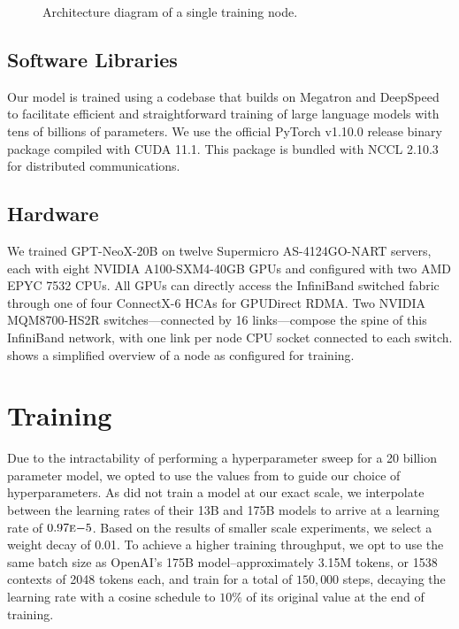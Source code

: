 \documentclass[11pt]{article}
\newcommand{\model}{GPT-NeoX-20B}
\begin{document}
\begin{figure}[hbt]
    \centering
    
    \caption{Architecture diagram of a single training node.}
    \label{fig:training-node}
\end{figure}

\subsection{Software Libraries}
\label{subsec:software}

Our model is trained using a codebase that builds on Megatron \citep{shoeybi2020megatronlm} and DeepSpeed \citep{rasley2020deepspeed} to facilitate efficient and straightforward training of large language models with tens of billions of parameters. We use the official PyTorch v1.10.0 release binary package compiled with CUDA 11.1. This package is bundled with NCCL 2.10.3 for distributed communications.

\subsection{Hardware}
\label{subsec:hardware}

We trained \model{} on twelve Supermicro AS-4124GO-NART servers, each with eight NVIDIA A100-SXM4-40GB GPUs and configured with two AMD EPYC 7532 CPUs. All GPUs can directly access the InfiniBand switched fabric through one of four ConnectX-6 HCAs for GPUDirect RDMA. Two NVIDIA MQM8700-HS2R switches---connected by 16 links---compose the spine of this InfiniBand network, with one link per node CPU socket connected to each switch.  shows a simplified overview of a node as configured for training.

\section{Training}

Due to the intractability of performing a hyperparameter sweep for a 20 billion parameter model, we opted to use the values from \citet{brown2020language} to guide our choice of hyperparameters. As \citet{brown2020language} did not train a model at our exact scale, we interpolate between the learning rates of their 13B and 175B models to arrive at a learning rate of $0.97\mathrm{\textsc{e}}{-5}$. Based on the results of smaller scale experiments, we select a weight decay of 0.01. To achieve a higher training throughput, we opt to use the same batch size as OpenAI's 175B model--approximately 3.15M tokens, or 1538 contexts of 2048 tokens each, and train for a total of $150,000$ steps, decaying the learning rate with a cosine schedule to $10\%$ of its original value at the end of training.
\end{document}

